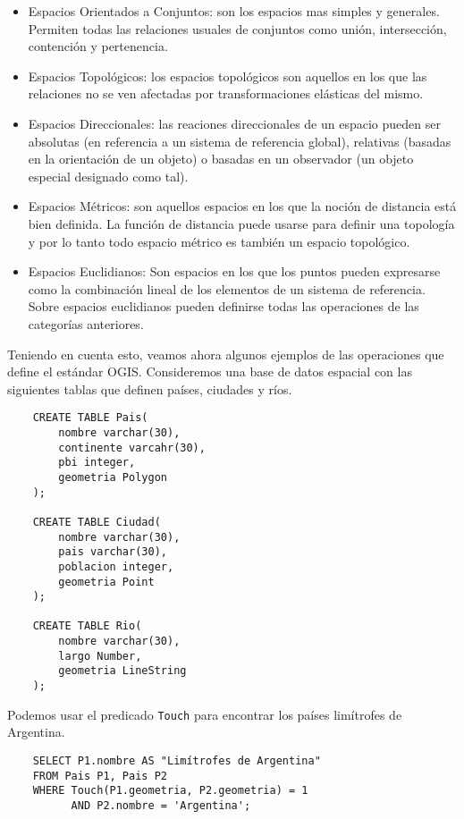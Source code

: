 \begin{itemize}
    \item Espacios Orientados a Conjuntos: son los espacios mas simples y generales.
    Permiten todas las relaciones usuales de conjuntos como unión, intersección, contención y pertenencia.
    \item Espacios Topológicos: los espacios topológicos son aquellos en los que las relaciones no se ven afectadas
    por transformaciones elásticas del mismo.
    \item Espacios Direccionales: las reaciones direccionales de un espacio pueden ser
    absolutas (en referencia a un sistema de referencia global),
    relativas (basadas en la orientación de un objeto)
    o basadas en un observador (un objeto especial designado como tal).
    \item Espacios Métricos: son aquellos espacios en los que la noción de distancia está bien definida. La función de distancia puede usarse
    para definir una topología y por lo tanto todo espacio métrico es también un espacio topológico.
    \item Espacios Euclidianos: Son espacios en los que los puntos pueden expresarse como la combinación lineal de los elementos de
    un sistema de referencia. Sobre espacios euclidianos pueden definirse todas las operaciones de las categorías anteriores.
\end{itemize}

Teniendo en cuenta esto, veamos ahora algunos ejemplos de las operaciones que define el estándar OGIS.
Consideremos una base de datos espacial con las siguientes tablas que definen países, ciudades y ríos.

\begin{verbatim}
    CREATE TABLE Pais(
        nombre varchar(30),
        continente varcahr(30),
        pbi integer,
        geometria Polygon
    );

    CREATE TABLE Ciudad(
        nombre varchar(30),
        pais varchar(30),
        poblacion integer,
        geometria Point
    );

    CREATE TABLE Rio(
        nombre varchar(30),
        largo Number,
        geometria LineString
    );
\end{verbatim}

Podemos usar el predicado \texttt{Touch} para encontrar los países limítrofes de Argentina.

\begin{verbatim}
    SELECT P1.nombre AS "Limítrofes de Argentina"
    FROM Pais P1, Pais P2
    WHERE Touch(P1.geometria, P2.geometria) = 1
          AND P2.nombre = 'Argentina';
\end{verbatim}

